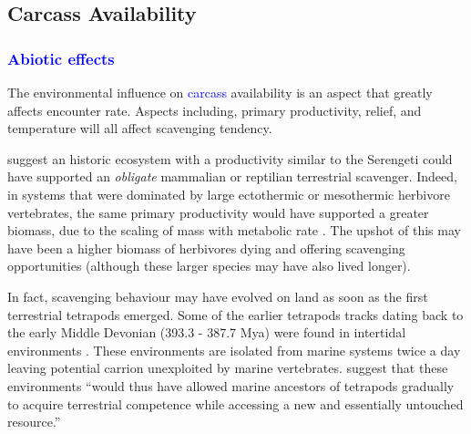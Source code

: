 \documentclass[a4paper,12pt]{article}
\begin{document}
\subsection{Carcass Availability}
\subsubsection{\textcolor{blue}{Abiotic effects}}
The environmental influence on \textcolor{blue}{carcass} availability is an aspect that greatly affects encounter rate. %
Aspects including, primary productivity, relief, and temperature will all affect scavenging tendency. 

\cite{ruxton2004obligate} suggest an historic ecosystem with a productivity similar to the Serengeti could have supported an \textit{obligate} mammalian or reptilian terrestrial scavenger.
Indeed, in systems that were dominated by large ectothermic or mesothermic herbivore vertebrates, the same primary productivity would have supported a greater biomass, due to the scaling of mass with metabolic rate \citep{mcnab2009resources}.
The upshot of this may have been a higher biomass of herbivores dying and offering scavenging opportunities (although these larger species may have also lived longer).

In fact, scavenging behaviour may have evolved on land as soon as the first terrestrial tetrapods emerged.
Some of the earlier tetrapods tracks dating back to the early Middle Devonian (393.3 - 387.7 Mya) were found in intertidal environments \citep{Niedzwiedzki2009}.
These environments are isolated from marine systems twice a day leaving potential carrion unexploited by marine vertebrates.
\cite{Niedzwiedzki2009} suggest that these environments ``would thus have allowed marine ancestors of tetrapods gradually to acquire terrestrial competence while accessing a new and essentially untouched resource.''
\end{document}
